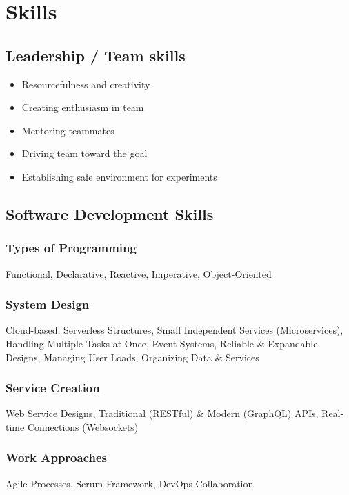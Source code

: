 \section*{Skills}

\subsection*{Leadership / Team skills}

\begin{itemize}[noitemsep, nosep]
  \item Resourcefulness and creativity
  \item Creating enthusiasm in team
  \item Mentoring teammates
  \item Driving team toward the goal
  \item Establishing safe environment for experiments
\end{itemize}

\subsection*{Software Development Skills}

\subsubsection*{Types of Programming}
Functional, Declarative, Reactive, Imperative, Object-Oriented

\subsubsection*{System Design}
Cloud-based, Serverless Structures, Small Independent Services (Microservices), Handling Multiple Tasks at Once, Event Systems, Reliable \& Expandable Designs, Managing User Loads, Organizing Data \& Services

\subsubsection*{Service Creation}
Web Service Designs, Traditional (RESTful) \& Modern (GraphQL) APIs, Real-time Connections (Websockets)

\subsubsection*{Work Approaches}
Agile Processes, Scrum Framework, DevOps Collaboration

